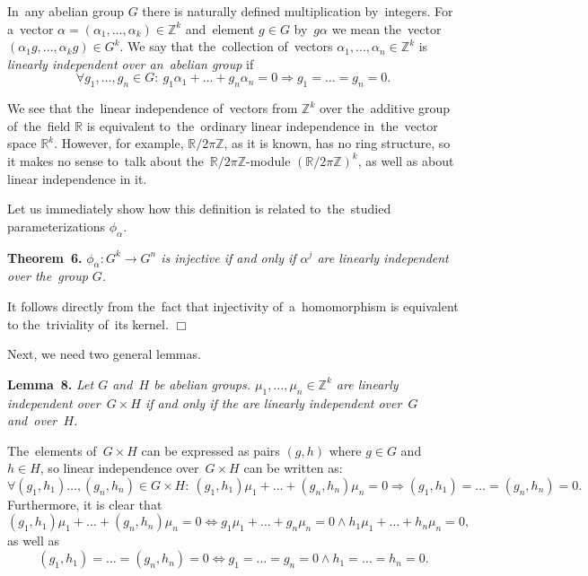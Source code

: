 \documentclass[twoside]{article}
\begin{document}
In~any abelian group $G$ there is naturally defined multiplication by~integers.
For a~vector $\alpha = (\alpha_1, \ldots, \alpha_k) \in \mathbb{Z}^k$ and~element $g \in G$
by~$g \alpha$ we mean the~vector $(\alpha_1 g, \ldots, \alpha_k g) \in G^k$. We say that
the~collection of~vectors $\alpha_1, \ldots, \alpha_n \in \mathbb{Z}^k$ is \textit{linearly independent
over an~abelian group} if
$$
    \forall g_1, \ldots, g_n \in G{:}\ g_1 \alpha_1 + \ldots + g_n \alpha_n = 0 \Rightarrow g_1 = \ldots = g_n = 0.
$$

We see that the~linear independence of~vectors from $\mathbb{Z}^k$ over the~additive group of~the~field $\mathbb{R}$
is equivalent to~the~ordinary linear independence in~the~vector space $\mathbb{R}^k$. However, for example,
$\mathbb{R} / 2 \pi \mathbb{Z}$, as it is known, has no ring structure, so it makes no sense
to~talk about the~$\mathbb{R} / 2 \pi \mathbb{Z}$-module $(\mathbb{R} / 2 \pi \mathbb{Z})^k$,
as well as about linear independence in it.

Let us immediately show how this definition is related to~the~studied parameterizations $\phi_\alpha$.

\medskip\noindent\textbf{Theorem~6.}\emph{
    $\phi_\alpha : G^k \rightarrow G^n$ is injective if and only if $\alpha^j$ are linearly independent over the~group $G$.
}\medskip

 It follows directly from the~fact that injectivity of~a~homomorphism is equivalent to the~triviality of~its kernel.
\hfill$\Box$\medskip

Next, we need two general lemmas.

\medskip\noindent\textbf{Lemma~8.}\emph{
    Let $G$ and~$H$ be abelian groups. $\mu_1,\allowbreak \ldots,\allowbreak \mu_n \in \mathbb{Z}^k$ are linearly independent
    over~$G \times H$ if and only if the are linearly independent over~$G$ and~over~$H$.
}\medskip

    The~elements of~$G \times H$ can be expressed as pairs $(g, h)$ where $g \in G$ and~$h \in H$,
    so linear independence over~$G \times H$ can be written as:
    $$
        \forall (g_1, h_1) \ldots, (g_n, h_n) \in G \times H{:}\ (g_1, h_1) \mu_1 + \ldots + (g_n, h_n) \mu_n = 0 \Rightarrow (g_1, h_1) = \ldots = (g_n, h_n) = 0.
    $$
    Furthermore, it is clear that
    $$
        (g_1, h_1) \mu_1 + \ldots + (g_n, h_n) \mu_n = 0 \Leftrightarrow g_1 \mu_1 + \ldots + g_n \mu_n = 0 \wedge h_1 \mu_1 + \ldots + h_n \mu_n = 0,
    $$
    as well as
    $$
        (g_1, h_1) = \ldots = (g_n, h_n) = 0 \Leftrightarrow g_1 = \ldots = g_n = 0 \wedge h_1 = \ldots = h_n = 0.
    $$
\end{document}

